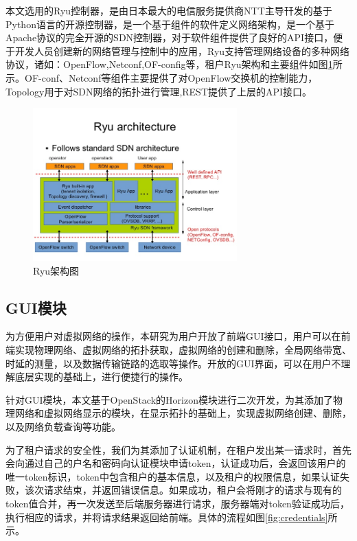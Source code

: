 本文选用的Ryu控制器，是由日本最大的电信服务提供商NTT主导幵发的基于Python语言的开源控制器，是一个基于组件的软件定义网络架构，是一个基于Apache协议的完全开源的SDN控制器，对于软件组件提供了良好的API接口，便于开发人员创建新的网络管理与控制中的应用，Ryu支持管理网络设备的多种网络协议，诸如：OpenFlow,Netconf,OF-config等，租户Ryu架构和主要组件如图\ref{fig:ryu}所示。OF-conf、Netconf等组件主要提供了对OpenFlow交换机的控制能力，Topology用于对SDN网络的拓扑进行管理,REST提供了上层的API接口。

\begin{figure}[!htb]
  \centering
  \includegraphics[width=0.7\textwidth]{logo/ryu.jpg}
  \caption{Ryu架构图}
  \label{fig:ryu}
\end{figure}

\subsection{GUI模块}
为方便用户对虚拟网络的操作，本研究为用户开放了前端GUI接口，用户可以在前端实现物理网络、虚拟网络的拓扑获取，虚拟网络的创建和删除，全局网络带宽、时延的测量，以及数据传输链路的选取等操作。开放的GUI界面，可以在用户不理解底层实现的基础上，进行便捷行的操作。

针对GUI模块，本文基于OpenStack的Horizon模块进行二次开发，为其添加了物理网络和虚拟网络显示的模块，在显示拓扑的基础上，实现虚拟网络创建、删除，以及网络负载查询等功能。

为了租户请求的安全性，我们为其添加了认证机制，在租户发出某一请求时，首先会向通过自己的户名和密码向认证模块申请token，认证成功后，会返回该用户的唯一token标识，token中包含租户的基本信息，以及租户的权限信息，如果认证失败，该次请求结束，并返回错误信息。如果成功，租户会将刚才的请求与现有的token值合并，再一次发送至后端服务器进行请求，服务器端对token验证成功后，执行相应的请求，并将请求结果返回给前端。具体的流程如图\ref{fig:credentials}所示。

